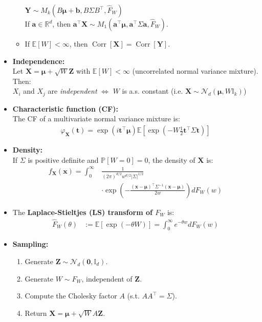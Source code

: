 \documentclass[a4paper,landscape,8pt,fleqn]{scrartcl}
\renewcommand{\emph}[1]{\textbf{#1}}
\DeclareMathOperator{\Corr}{Corr}				%
\begin{document}
\begin{multicols*}{3}
\begin{itemize}
\begin{itemize}
$\bm Y \sim M_k(B \bm \mu + \bm b, B \Sigma B^\top, \hat F_W)$ \\
If $\bm a \in \mathbb{R}^d$, then $\bm a^\top \bm X \sim M_1(\bm a^\top \bm \mu, \bm a^\top \Sigma \bm a, \hat F_W)$.
\item If $\mathbb{E}[W] < \infty$, then $\Corr[\bm X] = \Corr[\bm Y]$.
\end{itemize}
\item \emph{Independence:} \\
Let $\bm X = \bm \mu + \sqrt{W} \bm Z$ with $\mathbb{E}[W] < \infty$ (uncorrelated normal variance mixture). Then: \\
$X_i$ and $X_j$ are \textit{independent} $\iff$ $W$ is a.s. constant (i.e. $\bm X \sim \mathcal{N}_d(\bm \mu, W \mathbb{I}_k)$)
\item \emph{Characteristic function (CF):} \\
The CF of a multivariate normal variance mixture is:
\begin{align*}
\varphi_{\bm X}(\bm t) = \exp(i \bm t^\top \bm \mu) \mathbb{E} \left[ \exp \left( -W \frac{1}{2} \bm t^\top \Sigma \bm t \right) \right]
\end{align*}
\item \emph{Density:} \\
If $\Sigma$ is positive definite and $\mathbb{P}[W=0] = 0$, the density of $\bm X$ is:
\begin{align*}
f_{\bm X}(\bm x) = \int_0^\infty &\frac{1}{(2 \pi)^{d/2} w^{d/2} |\Sigma|^{1/2}} \\
&\cdot \exp \left( -\frac{(\bm x - \bm \mu)^\top \Sigma^{-1} (\bm x - \bm \mu)}{2w} \right) dF_W(w)
\end{align*}
\item The \emph{Laplace-Stieltjes (LS) transform of $F_W$} is:
\begin{align*}
\hat F_W(\theta) &:= \mathbb{E}[\exp(-\theta W)] = \int_0^\infty e^{-\theta w} dF_W(w)
\end{align*}
\item \emph{Sampling:}
\begin{enumerate}
\item Generate $\bm Z \sim \mathcal{N}_d(\bm 0, \mathbb{I}_d)$.
\item Generate $W \sim F_W$, independent of $\bm Z$.
\item Compute the Cholesky factor $A$ (s.t. $A A^\top = \Sigma$).
\item Return $\bm X = \bm \mu + \sqrt{W} A \bm Z$.
\end{enumerate}

\end{itemize}
\end{multicols*}
\end{document}
